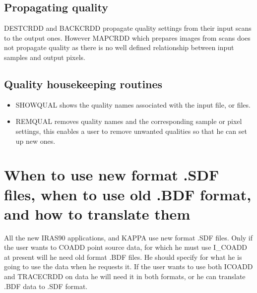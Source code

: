\documentclass[twoside,11pt]{starlink}
\begin{document}
\subsection{Propagating quality}
DESTCRDD and BACKCRDD propagate quality settings from their input scans to the
output ones. However MAPCRDD which prepares images from scans does not propagate
quality as there is no well defined relationship between input samples and
output  pixels.
\subsection{Quality housekeeping routines}
\begin{itemize}
\item SHOWQUAL shows the quality names associated with the input file, or files.
\item REMQUAL removes quality names and the corresponding sample or pixel
settings, this enables a user to remove unwanted qualities so that he can set
up new ones.
\end{itemize}
\newpage

\section{When to use new format .SDF files, when to use old .BDF format, and
how to translate them
\label{a:ndfout}}

All the new IRAS90 applications, and KAPPA use new format .SDF files. Only
if the user wants to COADD point source data, for which he must use I\_COADD
at present will he need old format .BDF files. He should specify for what he is
going to use the data when he requests it. If the user wants to use both
I\-COADD and TRACECRDD on data he will need it in both formats, or he can
translate .BDF data to .SDF format.
\end{document}
